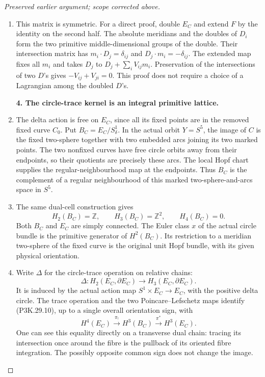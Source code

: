 \begin{proof}[Preserved earlier argument; scope corrected above]
\begin{enumerate}[label=\arabic*.]
\item This matrix is symmetric. For a direct proof, double \(E_C\)
and extend \(F\) by the identity on the second half. The
absolute meridians and the doubles of \(D_i\) form the two
primitive middle-dimensional groups of the double. Their
intersection matrix has \(m_i\cdot D_j=\delta_{ij}\) and
\(D_j\cdot m_i=-\delta_{ij}\). The extended map fixes all
\(m_i\) and takes \(D_j\) to \(D_j+\sum_iV_{ij}m_i\).
Preservation of the intersections of two \(D\)'s gives
\(-V_{ij}+V_{ji}=0\). This proof does not require a choice
of a Lagrangian among the doubled \(D\)'s.

\par\medskip\noindent\textbf{4. The circle-trace kernel is an integral primitive lattice.}\enspace

\item The delta action is free on \(E_C\), since all its fixed points
are in the removed fixed curve \(C_0\). Put
\(B_C=E_C/S^1_\delta\). In the actual orbit \(Y=S^5\), the
image of \(C\) is the fixed two-sphere together with two
embedded arcs joining its two marked points. The two
nonfixed curves have free circle orbits away from their
endpoints, so their quotients are precisely these arcs.
The local Hopf chart supplies the regular-neighbourhood
map at the endpoints. Thus \(B_C\) is the complement of a
regular neighbourhood of this marked two-sphere-and-arcs
space in \(S^5\).

\item The same dual-cell construction gives
\[
 H_2(B_C)=\mathbb Z,\qquad H_3(B_C)=\mathbb Z^2,\qquad
 H_4(B_C)=0.
                                                        \tag{P3K.29.9}
\]
Both \(B_C\) and \(E_C\) are simply connected. The Euler
class \(x\) of the actual circle bundle is the primitive
generator of \(H^2(B_C)\). Its restriction to a meridian
two-sphere of the fixed curve is the original unit Hopf
bundle, with its given physical orientation.

\item Write \(\Delta\) for the circle-trace operation on relative
chains:
\[
 \Delta:H_2(E_C,\partial E_C)\longrightarrow
          H_3(E_C,\partial E_C).
                                                        \tag{P3K.29.10}
\]
It is induced by the actual action map
\(S^1\times E_C\to E_C\), with the positive delta circle.
The trace operation and the two Poincare--Lefschetz maps
identify (P3K.29.10), up to a single overall orientation
sign, with
\[
 H^4(E_C)\xrightarrow{\pi_!}H^3(B_C)
                    \xrightarrow{\pi^*}H^3(E_C).
                                                        \tag{P3K.29.11}
\]
One can see this equality directly on a transverse dual
chain: tracing its intersection once around the fibre is
the pullback of its oriented fibre integration. The
possibly opposite common sign does not change the image.


\end{enumerate}
\end{proof}
